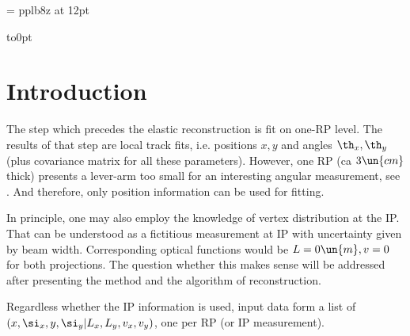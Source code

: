 





\font\fPbxii 	= pplb8z at 12pt

\Reftrue
\NumberSectionstrue



\def\Exp#1{\left\langle#1\right\rangle}

\BeginText

\vbox to0pt{\vss{}}




\section[intro]{Introduction}

The step which precedes the elastic reconstruction is fit on one-RP level. The results of that step are local track fits, i.e. positions $x, y$ and angles $\th_x, \th_y$ (plus covariance matrix for all these parameters). However, one RP (ca $3\un{cm}$ thick) presents a lever-arm too small for an interesting angular measurement, see . And therefore, only position information can be used for fitting.

In principle, one may also employ the knowledge of vertex distribution at the IP. That can be understood as a fictitious measurement at IP with uncertainty given by beam width. Corresponding optical functions would be $L = 0\un{m}, v = 0$ for both projections. The question whether this makes sense will be addressed after presenting the method and the algorithm of reconstruction.

Regardless whether the IP information is used, input data form a list of $(x, \si_x, y, \si_y|\penalty0 L_x, L_y, v_x, v_y)$, one per RP (or IP measurement).

